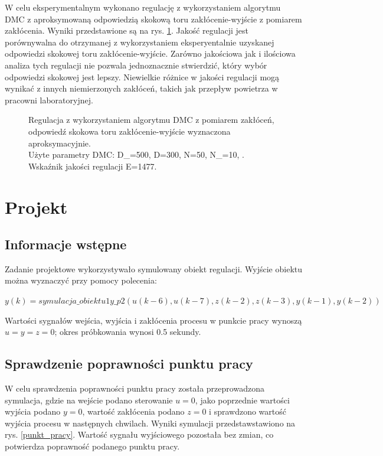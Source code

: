\documentclass[a4paper,titlepage,11pt,twosides,floatssmall]{mwrep}
\begin{document}
W celu eksperymentalnym wykonano regulację z wykorzystaniem algorytmu DMC z aproksymowaną odpowiedzią skokową toru zakłócenie-wyjście z pomiarem zakłócenia. Wyniki przedstawione są na rys. \ref{kom_s_apro}. Jakość regulacji jest porównywalna do otrzymanej z wykorzystaniem eksperyentalnie uzyskanej odpowiedzi skokowej toru zakłócenie-wyjście. Zarówno jakościowa jak i ilościowa analiza tych regulacji nie pozwala jednoznacznie stwierdzić, który wybór odpowiedzi skokowej jest lepszy. Niewielkie różnice w jakości regulacji mogą wynikać z innych niemierzonych zakłóceń, takich jak przepływ powietrza w pracowni laboratoryjnej.

\begin{figure}[htb]
	\centering
	
	\caption{Regulacja z wykorzystaniem algorytmu DMC z pomiarem zakłóceń, odpowiedź skokowa toru zakłócenie-wyjście wyznaczona aproksymacyjnie. \\Użyte parametry DMC: D_{}=500, D=300, N=50, N_{}=10, .\\ Wskaźnik jakości regulacji E=1477.}
	\label{kom_s_apro}
\end{figure}



\chapter{Projekt}
\section{Informacje wstępne}

Zadanie projektowe wykorzystywało symulowany obiekt regulacji. Wyjście obiektu można wyznaczyć przy pomocy polecenia:

$y(k)=symulacja\_obiektu1y\_p2(u(k-6),u(k-7),z(k-2),z(k-3),y(k-1),y(k-2))$

Wartości sygnałów wejścia, wyjścia i zakłócenia procesu w punkcie pracy wynoszą $u = y = z = 0$; okres próbkowania wynosi \num{0,5} sekundy.


\section{Sprawdzenie poprawności punktu pracy}

W celu sprawdzenia poprawności punktu pracy została przeprowadzona symulacja, gdzie na wejście podano sterowanie $u = 0$, jako poprzednie wartości wyjścia podano $y = 0$, wartość zakłócenia podano $z = 0$ i sprawdzono wartość wyjścia procesu w następnych chwilach. Wyniki symulacji przedstawstawiono na rys. \ref{punkt_pracy}. Wartość sygnału wyjściowego pozostała bez zmian, co potwierdza poprawność podanego punktu pracy.
\end{document}

